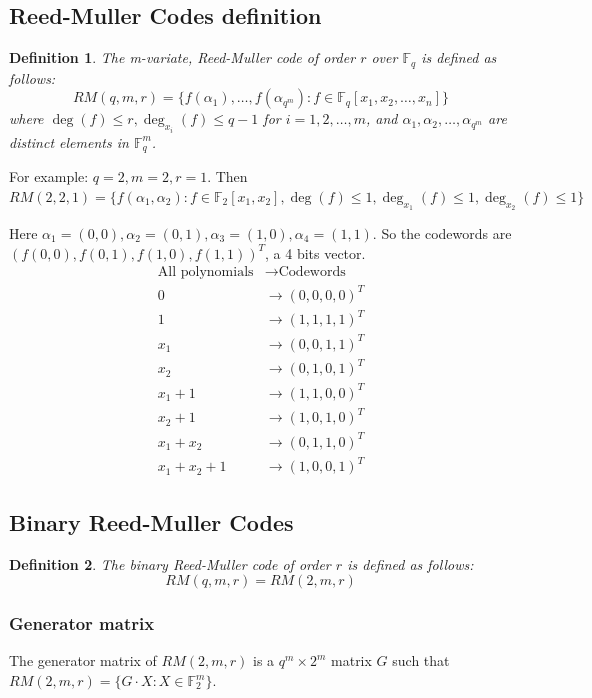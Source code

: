 \documentclass[letterpaper,12pt]{article}
\newtheorem{definition}{Definition}
\begin{document}
\subsection{Reed-Muller Codes definition}
\begin{definition}
    The m-variate, Reed-Muller code of order $r$ over $\mathbb{F}_q$ is defined as follows: \[
        RM(q,m,r)= \{f(\alpha_1),\ldots, f(\alpha_{q^m}): f\in\mathbb{F}_q[x_1,x_2,\ldots,x_n] \}
    \]
    where $\deg(f)\le r, \deg_{x_i}(f)\le q-1$ for $i=1,2,\ldots,m$, and $\alpha_1,\alpha_2,\ldots,\alpha_{q^m}$ are distinct elements in $\mathbb{F}_q^m$.
\end{definition}

For example: $q=2,m=2,r=1$. Then $RM(2,2,1)=\{f(\alpha_1,\alpha_2): f\in\mathbb{F}_2[x_1,x_2], \deg(f)\le 1, \deg_{x_1}(f)\le 1, \deg_{x_2}(f)\le 1\}$

Here $\alpha_1=(0,0), \alpha_2=(0,1), \alpha_3=(1,0), \alpha_4=(1,1)$. So the codewords are $(f(0,0),f(0,1),f(1,0),f(1,1))^T$, a 4 bits vector.
\begin{align*}
    \text{All polynomials} & \to \text{Codewords} \\
    0                      & \to (0,0,0,0)^T         \\
    1                      & \to (1,1,1,1)^T         \\
    x_1                    & \to (0,0,1,1)^T         \\
    x_2                    & \to (0,1,0,1)^T         \\
    x_1+1                  & \to (1,1,0,0)^T         \\
    x_2+1                  & \to (1,0,1,0)^T         \\
    x_1+x_2                & \to (0,1,1,0)^T         \\
    x_1+x_2+1              & \to (1,0,0,1)^T
\end{align*}
\subsection{Binary Reed-Muller Codes}
\begin{definition}
    The binary Reed-Muller code of order $r$ is defined as follows: \[
        RM(q,m,r)=RM(2,m,r)
    \]
\end{definition}
\subsubsection{Generator matrix}
The generator matrix of $RM(2,m,r)$ is a $q^m\times 2^m$ matrix $G$ such that $RM(2,m,r)=\{G\cdot X: X\in \mathbb{F}_2^m\}$.
\end{document}

